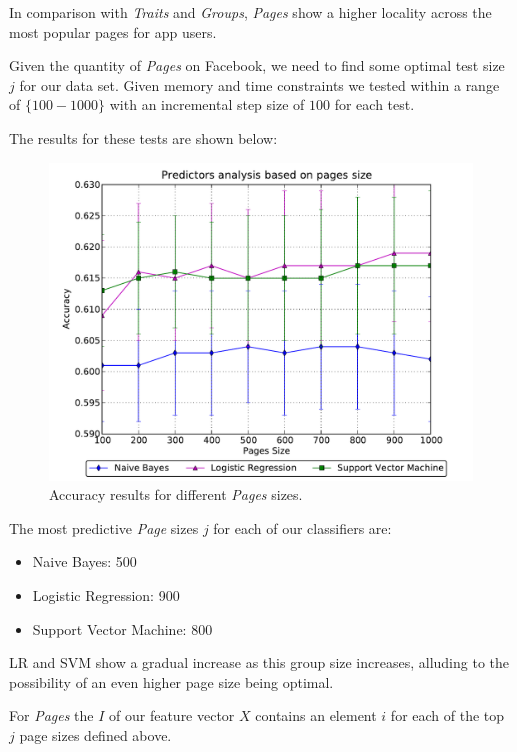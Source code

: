 In comparison with \emph{Traits} and \emph{Groups}, \emph{Pages} show a higher locality across the most popular pages for app users.

Given the quantity of \emph{Pages} on Facebook, we need to find some optimal test size $j$ for our data set. Given memory and time constraints we tested 
within a range of $\{100-1000\}$ with an incremental step size of $100$ for each test.

\clearpage

The results for these tests are shown below:

\begin{figure}[h]
	\begin{center}
		\includegraphics[scale=0.75]{results/pages/top_pages.pdf}
		\caption{Accuracy results for different \emph{Pages} sizes.}
	\end{center}
\end{figure}

The most predictive \emph{Page} sizes $j$ for each of our classifiers are:
\begin{itemize}
\item Naive Bayes: 500
\item Logistic Regression: 900
\item Support Vector Machine: 800
\end{itemize}

LR and SVM show a gradual increase as this group size increases, alluding to the possibility of an even higher page size being optimal.

For \emph{Pages} the $I$ of our feature vector $X$ contains an element $i$ for each of the top $j$ page sizes defined above.

